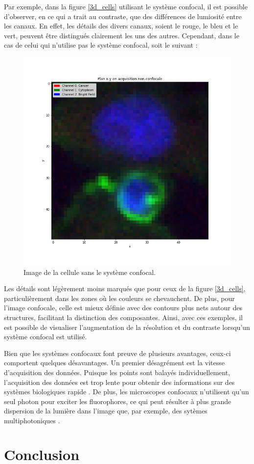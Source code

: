 \documentclass[11pt,letterpaper]{article}
\begin{document}
Par exemple, dans la figure \ref{3d_cells} utilisant le système confocal, il est possible d'observer, en ce qui a trait au contraste, que des différences de lumiosité entre les canaux. En effet, les détails des divers canaux, soient le rouge, le bleu et le vert, peuvent être distingués clairement les uns des autres. Cependant, dans le cas de celui qui n'utilise pas le système confocal, soit le suivant :
\begin{figure}[H]
  \centering
  \includegraphics[scale=0.2]{xy_plane_non_confocal.png}
  \caption{Image de la cellule sans le système confocal.}
  \label{non-confocal}
\end{figure}
Les détails sont légèrement moins marqués que pour ceux de la figure \ref{3d_cells}, particulièrement dans les zones où les couleurs se chevauchent. De plus, pour l'image confocale, celle est mieux définie avec des contours plus nets autour des structures, facilitant la distinction des composantes. Ainsi, avec ces exemples, il est possible de visualiser l'augmentation de la résolution et du contraste lorsqu'un système confocal est utilisé.

Bien que les systèmes confocaux font preuve de plusieurs avantages, ceux-ci comportent quelques désavantages. Un premier désagrément est la vitesse d'acquisition des données. Puisque les points sont balayés individuellement, l'acquisition des données est trop lente pour obtenir des informations sur des systèmes biologiques rapide \cite{st_croix_confocal_2005}. De plus, les microscopes confocaux n'utilisent qu'un seul photon pour exciter les fluorophores, ce qui peut résulter à plus grande dispersion de la lumière dans l'image que, par exemple, des sytèmes multiphotoniques \cite{francis_confocal_2023}.

\section{Conclusion}



\clearpage




\end{document}
